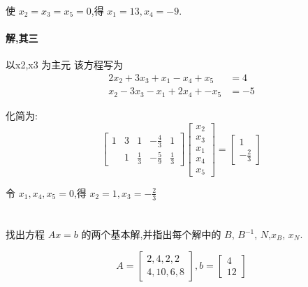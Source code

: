 \documentclass[a4paper]{article}
\begin{document}
使 $x_2= x_3 = x_5 = 0$,得 $x_1 = 13, x_4 = -9$.
\paragraph{解,其三} 以x2,x3 为主元 该方程写为
\[\begin{aligned}
   2x_2 + 3 x_3+ x_1 - x_4  + x_5 &= 4\\
     x_2 - 3 x_3-x_1 + 2x_4 + - x_5 &= -5
\end{aligned}\]

化简为:
\[
\begin{bmatrix}
1 & 3 & 1 & -\frac{4}{3} & 1 \\
  & 1 & \frac{1}{3} & -\frac{5}{9} & \frac{1}{3}  
\end{bmatrix}
\left[\begin{array}{c} x_2 \\ x_3 \\ x_1 \\ x_4 \\x_5 \end{array}\right] =
\left[\begin{array}{c} 1 \\ -\frac{2}{3}\end{array}\right]
\]

令 $x_1,x_4,x_5 = 0$,得 $x_2 = 1, x_3 = -\frac{2}{3}$

\section{}
找出方程 $Ax = b$ 的两个基本解,并指出每个解中的 $B$, $B^{-1}$, $N$,$x_B$, $x_N$.

\[ A = \left[\begin{array}{cccc} 2,4,2,2 \\ 4,10,6,8\end{array}\right], b = \left[\begin{array}{c}4 \\ 12\end{array}\right]
\]
\end{document}
